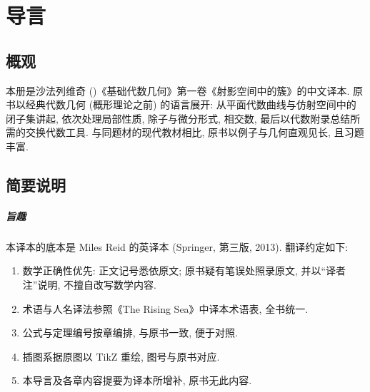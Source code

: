 
	\chapter*{导言}

\section*{概观}

本册是沙法列维奇 (\trShafarevich)《基础代数几何》第一卷《射影空间中的簇》的中文译本\cite{shafarevich2013}. 原书以经典代数几何 (概形理论之前) 的语言展开: 从平面代数曲线与仿射空间中的闭子集讲起, 依次处理局部性质, 除子与微分形式, 相交数, 最后以代数附录总结所需的交换代数工具. 与同题材的现代教材相比, 原书以例子与几何直观见长, 且习题丰富.

\section*{简要说明}
\paragraph*{旨趣}
本译本的底本是 Miles Reid 的英译本 (Springer, 第三版, 2013). 翻译约定如下:
\begin{enumerate}
	\item 数学正确性优先: 正文记号悉依原文; 原书疑有笔误处照录原文, 并以``译者注''说明, 不擅自改写数学内容.
	\item 术语与人名译法参照《The Rising Sea》中译本术语表, 全书统一.
	\item 公式与定理编号按章编排, 与原书一致, 便于对照.
	\item 插图系据原图以 TikZ 重绘, 图号与原书对应.
	\item 本导言及各章内容提要为译本所增补, 原书无此内容.
\end{enumerate}

